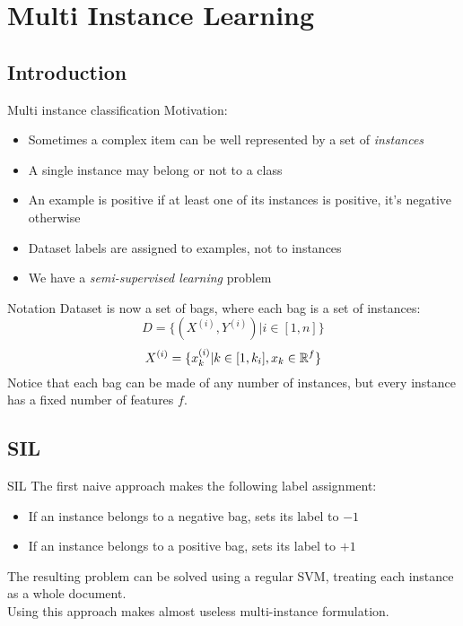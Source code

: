 \section{Multi Instance Learning}
 
\subsection{Introduction}
\begin{frame}{Multi instance classification}
	Motivation:
	\begin{itemize}\setlength\itemsep{1em}
		\item Sometimes a complex item can be well represented by a set of \textit{instances}
		\item A single instance may belong or not to a class
		\item An example is positive if at least one of its instances is positive, it's negative otherwise
		\item Dataset labels are assigned to examples, not to instances
		\item We have a \textit{semi-supervised learning} problem
	\end{itemize}
\end{frame}

\begin{frame}{Notation}
	Dataset is now a set of bags, where each bag is a set of instances:
	$$D = \{(X^{(i)}, Y^{(i)}) | i \in [1, n]\}$$
	$$X^{(i)} = \{x_k^{(i)} | k \in [1, k_i], x_k \in \mathbb{R}^f\}$$
	Notice that each bag can be made of any number of instances, but every instance has a fixed number of features $f$.
\end{frame}

\subsection{SIL}
\begin{frame}{SIL}
	The first naive approach makes the following label assignment:
	\begin{itemize}\setlength\itemsep{1em}
		\item If an instance belongs to a negative bag, sets its label to $-1$
		\item If an instance belongs to a positive bag, sets its label to $+1$
	\end{itemize}
	\vspace{5px}
	The resulting problem can be solved using a regular SVM, treating each instance as a whole document.\\
	\vspace{12px}
	Using this approach makes almost useless multi-instance formulation.
\end{frame}


